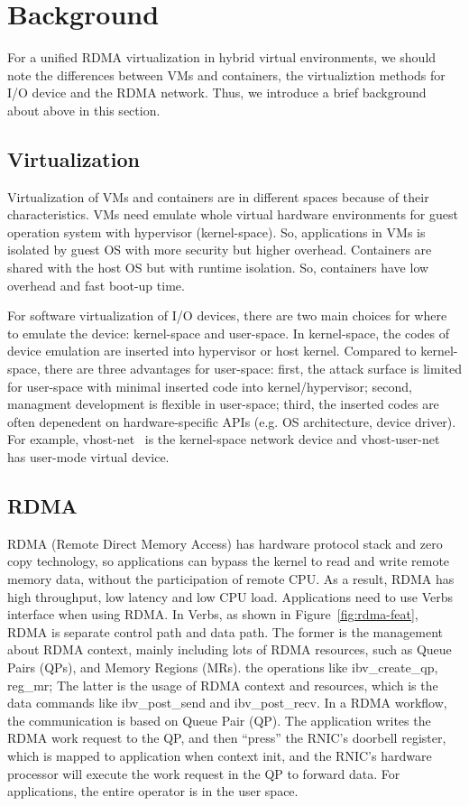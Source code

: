 \section{Background}
For a unified RDMA virtualization in hybrid virtual environments, we should note the differences between VMs and containers, the virtualiztion methods for I/O device and the RDMA network. Thus, we introduce a brief background about above in this section.

\subsection{Virtualization}
Virtualization of VMs and containers are in different spaces because of their characteristics. VMs need emulate whole virtual hardware environments for guest operation system with hypervisor (kernel-space). So, applications in VMs is isolated by guest OS with more security but higher overhead. Containers are shared with the host OS but with runtime isolation. So, containers have low overhead and fast boot-up time.

For software virtualization of I/O devices, there are two main choices for where to emulate the device: kernel-space and user-space. In kernel-space, the codes of device emulation are inserted into hypervisor or host kernel. Compared to kernel-space, there are three advantages for user-space: first, the attack surface is limited for user-space with minimal inserted code into kernel/hypervisor; second, managment development is flexible in user-space; third, the inserted codes are often depenedent on hardware-specific APIs (e.g. OS architecture, device driver). For example, vhost-net~\cite{vhost-net} is the kernel-space network device and vhost-user-net~\cite{vhost-user-net} has user-mode virtual device. 


\subsection{RDMA}
RDMA (Remote Direct Memory Access) has hardware protocol stack and zero copy technology, so applications can bypass the kernel to read and write remote memory data, without the participation of remote CPU. As a result, RDMA has high throughput, low latency and low CPU load. Applications need to use Verbs interface when using RDMA. In Verbs, as shown in Figure~\ref{fig:rdma-feat}, RDMA is separate control path and data path. The former is the management about RDMA context, mainly including lots of RDMA resources, such as Queue Pairs (QPs), and Memory Regions (MRs). the operations like ibv\_create\_qp, reg\_mr; The latter is the usage of RDMA context and resources, which is the data commands like ibv\_post\_send and ibv\_post\_recv. In a RDMA workflow, the communication is based on Queue Pair (QP). The application writes the RDMA work request to the QP, and then ``press''  the RNIC's doorbell register, which is mapped to application when context init, and the RNIC's hardware processor will execute the work request in the QP to forward data. For applications, the entire operator is in the user space.



